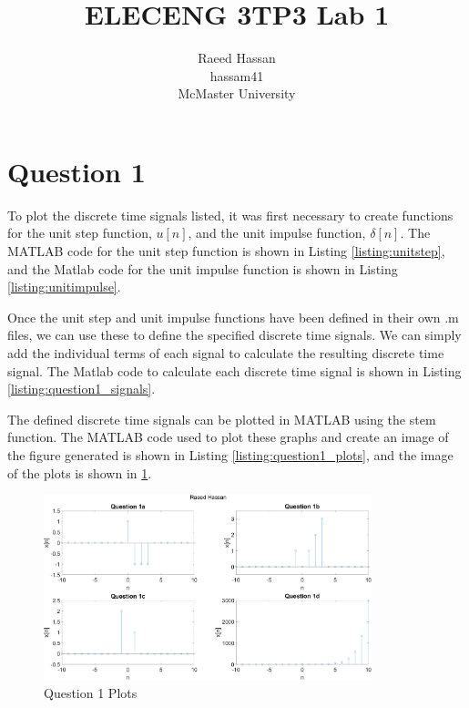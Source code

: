 \documentclass[12pt]{article}
\title{ELECENG 3TP3 Lab 1}
\author{Raeed Hassan \\ hassam41 \\ McMaster University}
\begin{document}
\maketitle
\pagebreak
\section*{Question 1}
To plot the discrete time signals listed, it was first necessary to create functions for the unit step function, $u[n]$, and the unit impulse function, $\delta[n]$. The MATLAB code for the unit step function is shown in Listing \ref{listing:unitstep}, and the Matlab code for the unit impulse function is shown in Listing \ref{listing:unitimpulse}.


Once the unit step and unit impulse functions have been defined in their own .m files, we can use these to define the specified discrete time signals. We can simply add the individual terms of each signal to calculate the resulting discrete time signal. The Matlab code to calculate each discrete time signal is shown in Listing \ref{listing:question1_signals}.

The defined discrete time signals can be plotted in MATLAB using the stem function. The MATLAB code used to plot these graphs and create an image of the figure generated is shown in Listing \ref{listing:question1_plots}, and the image of the plots is shown in \ref{fig:question1_plots}. 

\begin{figure}[!ht]
    \centering
    \includegraphics[width=0.85\textwidth]{question1.png}
    \caption{Question 1 Plots}
    \label{fig:question1_plots}
\end{figure}
\pagebreak
\end{document}
